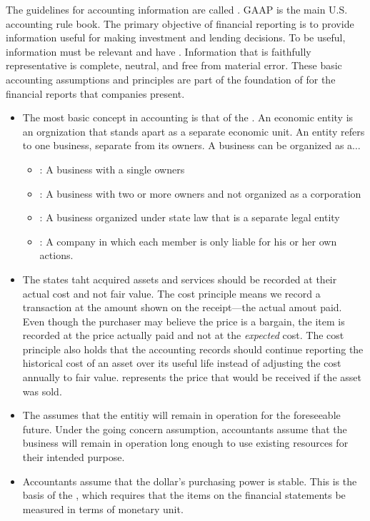 \documentclass{article}
\begin{document}
The guidelines for accounting information are called . GAAP is the main U.S. accounting rule book. The primary objective of financial reporting is to provide information useful for making investment and lending decisions. To be useful, information must be relevant and have . Information that is faithfully representative is complete, neutral, and free from material error. These basic accounting assumptions and principles are part of the foundation of for the financial reports that companies present. 

\begin{itemize}
  \item The most basic concept in accounting is that of the . An economic entity is an orgnization that stands apart as a separate economic unit. An entity refers to one business, separate from its owners. A business can be organized as a$\dots$ 
    \begin{itemize}
      \item {}: A business with a single owners 
      \item {}: A business with two or more owners and not organized as a corporation
      \item {}: A business organized under state law that is a separate legal entity 
      \item {}: A company in which each member is only liable for his or her own actions. 
    \end{itemize}
  \item The  states taht acquired assets and services should be recorded at their actual cost and not fair value. The cost principle means we record a transaction at the amount shown on the receipt---the actual amout paid. Even though the purchaser may believe the price is a bargain, the item is recorded at the price actually paid and not at the \emph{expected} cost. The cost principle also holds that the accounting records should continue reporting the historical cost of an asset over its useful life instead of adjusting the cost annually to fair value.  represents the price that would be received if the asset was sold. 
  \item The  assumes that the entitiy will remain in operation for the foreseeable future. Under the going concern assumption, accountants assume that the business will remain in operation long enough to use existing resources for their intended purpose. 
  \item Accountants assume that the dollar's purchasing power is stable. This is the basis of the , which requires that the items on the financial statements be measured in terms of monetary unit. 
\end{itemize}
\end{document}
